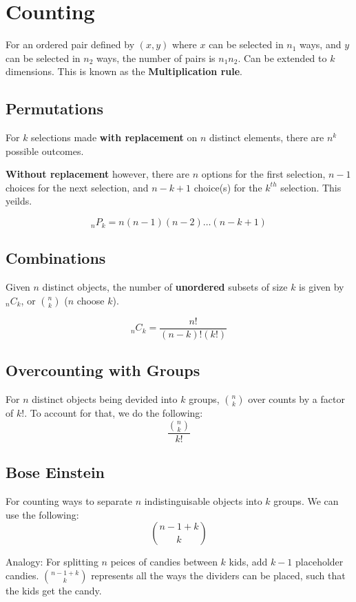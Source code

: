 \documentclass{article}
\begin{document}
{		\section*{\Large{\textbf{Counting}}}
			For an ordered pair defined by \((x, y)\) where \(x\) can be selected in \(n_1\) ways, and \(y\) can be selected in \(n_2\) ways, the number of pairs is \(n_1 n_2\). Can be extended to \(k\) dimensions. This is known as the \textbf{Multiplication rule}.

			\subsection*{Permutations}
				For \(k\) selections made \textbf{with replacement} on \(n\) distinct elements, there are \(n^k\) possible outcomes.

				\textbf{Without replacement} however, there are \(n\) options for the first selection, \(n-1\) choices for the next selection, and \(n-k+1\) choice(s) for the \(k^{th}\) selection. This yeilds.

				\[_{n}P_{k} = n(n-1)(n-2) \ldots (n-k+1)\]

			\subsection*{Combinations}
				Given \(n\) distinct objects, the number of \textbf{unordered} subsets of size \(k\) is given by \(_{n}C_{k}\), or \(\binom{n}{k}\) (\(n\) choose \(k\)).

				\[_{n}C_{k} = \frac{n!}{(n-k)!(k!)} \]

			\subsection*{Overcounting with Groups}
				For \(n\) distinct objects being devided into \(k\) groups, \(\binom{n}{k} \) over counts by a factor of \(k!\). To account for that, we do the following:
				\[
					\frac{\binom{n}{k}}{k!}
				\]

			\subsection*{Bose Einstein}
				For counting ways to separate \(n\) indistinguisable objects into \(k\) groups. We can use the following:
					\[
						\binom{n - 1 + k}{k}
					\]

				Analogy: For splitting \(n\) peices of candies between \(k\) kids, add \(k-1\) placeholder candies. \(\binom{n-1+k}{k}\) represents all the ways the dividers can be placed, such that the kids get the candy.

}
\end{document}
